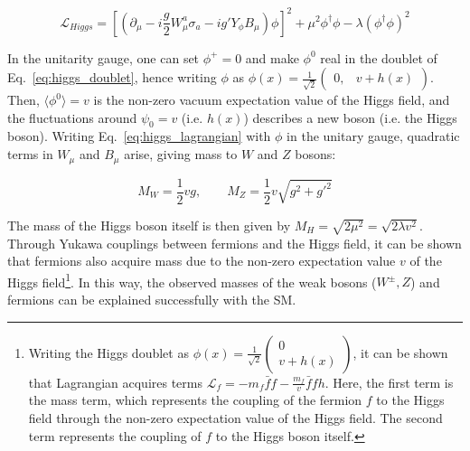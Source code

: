 \begin{equation}
    \mathcal{L}_{Higgs} = \left[ \left( \partial_{\mu} - i \frac{g}{2} W_{\mu}^{a} \sigma_{a} - ig' Y_{\phi} B_{\mu} \right) \phi \right]^{2} + \mu^2 \phi^{\dag} \phi - \lambda \left( \phi^{\dag} \phi \right)^{2}
    \label{eq:higgs_lagrangian}
\end{equation}

In the unitarity gauge, one can set $\phi^{+} = 0$ and make $\phi^{0}$ real in the doublet of Eq.~\ref{eq:higgs_doublet}, hence writing $\phi$ as
$\phi(x) = \frac{1}{\sqrt{2}} \begin{pmatrix} 0, & v + h(x) \end{pmatrix}$. 
Then, $\langle \phi^{0} \rangle = v$ is the non-zero vacuum expectation value of the Higgs field, and the fluctuations around $\psi_{0} = v$
(i.e. $h(x)$) describes a new boson (i.e. the Higgs boson). Writing Eq.~\ref{eq:higgs_lagrangian} with $\phi$ in the unitary gauge, 
quadratic terms in $W_{\mu}$ and $B_{\mu}$ arise, giving mass to $W$ and $Z$ bosons:

\begin{equation}
    M_{W} = \frac{1}{2} v g, \qquad M_{Z} = \frac{1}{2} v \sqrt{g^2 + g'^{2}}
\end{equation}

The mass of the Higgs boson itself is then given by $M_{H} = \sqrt{2 \mu^2} = \sqrt{2 \lambda v^2}$. Through Yukawa couplings between fermions and the
Higgs field, it can be shown that fermions also acquire mass due to the non-zero expectation value $v$ 
of the Higgs field\footnote{Writing the Higgs doublet as $\phi(x) = \frac{1}{\sqrt{2}} \begin{pmatrix} 0 \\ v + h(x) \end{pmatrix}$, it can be shown that
Lagrangian acquires terms $\mathcal{L}_{f} = -m_{f} \bar{f} f - \frac{m_f}{v} \bar{f} f h $. Here, the first term is the mass term, which
represents the coupling of the fermion $f$ to the Higgs field through the non-zero expectation value of the Higgs field.
The second term represents the coupling of $f$ to the Higgs boson itself.}. In this way, the observed masses of the weak bosons ($W^{\pm}, Z$)
and fermions can be explained successfully with the SM.

